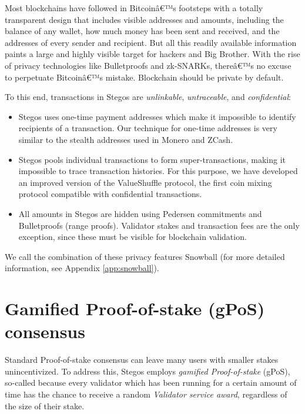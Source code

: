 \documentclass[8pt,fleqn,openany]{book}
\begin{document}
	Most blockchains have followed in Bitcoinâ€™s footsteps with a totally transparent design that includes visible addresses and amounts, including the balance of any wallet, how much money has been sent and received, and the addresses of every sender and recipient. But all this readily available information paints a large and highly visible target for hackers and Big Brother. With the rise of privacy technologies like Bulletproofs and zk-SNARKs, thereâ€™s no excuse to perpetuate Bitcoinâ€™s mistake. Blockchain should be private by default.
	
	To this end, transactions in Stegos are \textit{unlinkable}, \textit{untraceable}, and \textit{confidential}:
	
	\begin{itemize}
		\item Stegos uses one-time payment addresses which make it impossible to identify recipients of a transaction. Our technique for one-time addresses is very similar to the stealth addresses used in Monero and ZCash.
		\item Stegos pools individual transactions to form super-transactions, making it impossible to trace transaction histories. For this purpose, we have developed an improved version of the ValueShuffle protocol\cite{c7}, the first coin mixing protocol compatible with confidential transactions.
		\item All amounts in Stegos are hidden using Pedersen commitments\cite{c8} and Bulletproofs (range proofs)\cite{c4}. Validator stakes and transaction fees are the only exception, since these must be visible for blockchain validation.\end{itemize}
	
	We call the combination of these privacy features Snowball (for more detailed information, see Appendix \ref{app:snowball}). %
	
	\section{Gamified Proof-of-stake (gPoS) consensus}
	
	Standard Proof-of-stake consensus can leave many users with smaller stakes unincentivized. To address this, Stegos employs \textit{gamified Proof-of-stake} (gPoS), so-called because every validator which has been running for a certain amount of time has the chance to receive a random \textit{Validator service award}, regardless of the size of their stake\footnotemark.
	
\end{document}
